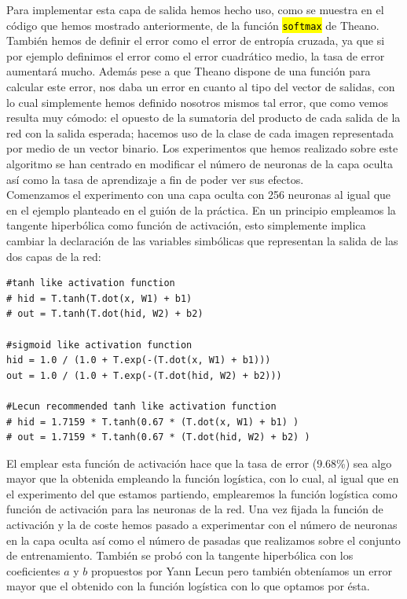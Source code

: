 \documentclass[10pt,a4paper]{article}
\newcommand{\code}[1]{\sethlcolor{light-gray}\hl{\texttt{#1}}} %
\begin{document}
Para implementar esta capa de salida hemos hecho uso, como se muestra en el código que hemos mostrado anteriormente, de la función \code{softmax} de Theano. También hemos de definir el error como el error de entropía cruzada, ya que si por ejemplo definimos el error como el error cuadrático medio, la tasa de error aumentará mucho. Además pese a que Theano dispone de una función para calcular este error, nos daba un error en cuanto al tipo del vector de salidas, con lo cual simplemente hemos definido nosotros mismos tal error, que como vemos resulta muy cómodo: el opuesto de la sumatoria del producto de cada salida de la red con la salida esperada; hacemos uso de la clase de cada imagen representada por medio de un vector binario. Los experimentos que hemos realizado sobre este algoritmo se han centrado en modificar el número de neuronas de la capa oculta así como la tasa de aprendizaje a fin de poder ver sus efectos.\\

Comenzamos el experimento con una capa oculta con 256 neuronas al igual que en el ejemplo planteado en el guión de la práctica. En un principio empleamos la tangente hiperbólica como función de activación, esto simplemente implica cambiar la declaración de las variables simbólicas que representan la salida de las dos capas de la red:

\begin{lstlisting}
#tanh like activation function
# hid = T.tanh(T.dot(x, W1) + b1)
# out = T.tanh(T.dot(hid, W2) + b2)

#sigmoid like activation function
hid = 1.0 / (1.0 + T.exp(-(T.dot(x, W1) + b1)))
out = 1.0 / (1.0 + T.exp(-(T.dot(hid, W2) + b2)))

#Lecun recommended tanh like activation function
# hid = 1.7159 * T.tanh(0.67 * (T.dot(x, W1) + b1) )
# out = 1.7159 * T.tanh(0.67 * (T.dot(hid, W2) + b2) )
\end{lstlisting}

El emplear esta función de activación hace que la tasa de error (9.68\%) sea algo mayor que la obtenida empleando la función logística, con lo cual, al igual que en el experimento del que estamos partiendo, emplearemos la función logística como función de activación para las neuronas de la red. Una vez fijada la función de activación y la de coste hemos pasado a experimentar con el número de neuronas en la capa oculta así como el número de pasadas que realizamos sobre el conjunto de entrenamiento. También se probó con la tangente hiperbólica con los coeficientes $a$ y $b$ propuestos por Yann Lecun pero también obteníamos un error mayor que el obtenido con la función logística con lo que optamos por ésta.\\
\end{document}
